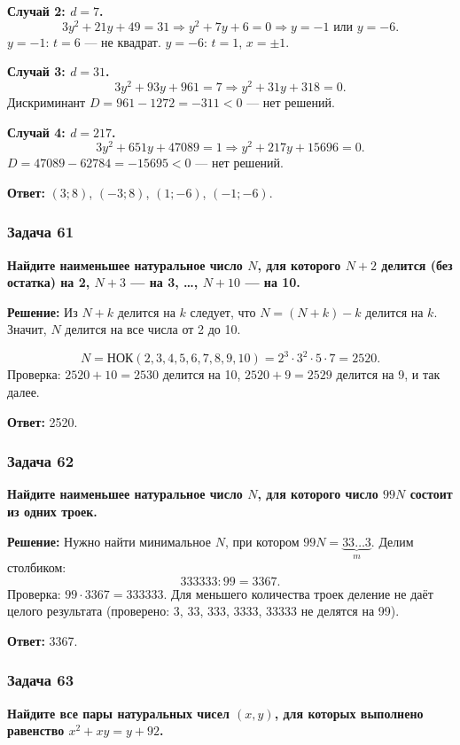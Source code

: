 \documentclass[12pt, a4paper]{article}
\begin{document}
\textbf{Случай 2: $d = 7$.}
\[
3y^2 + 21y + 49 = 31 \Rightarrow y^2 + 7y + 6 = 0 \Rightarrow y = -1 \text{ или } y = -6.
\]
$y = -1$: $t = 6$ — не квадрат. $y = -6$: $t = 1$, $x = \pm 1$.

\textbf{Случай 3: $d = 31$.}
\[
3y^2 + 93y + 961 = 7 \Rightarrow y^2 + 31y + 318 = 0.
\]
Дискриминант $D = 961 - 1272 = -311 < 0$ — нет решений.

\textbf{Случай 4: $d = 217$.}
\[
3y^2 + 651y + 47089 = 1 \Rightarrow y^2 + 217y + 15696 = 0.
\]
$D = 47089 - 62784 = -15695 < 0$ — нет решений.

\textbf{Ответ:} $(3; 8)$, $(-3; 8)$, $(1; -6)$, $(-1; -6)$.

\subsubsection*{Задача 61}
\textbf{Найдите наименьшее натуральное число $N$, для которого $N + 2$ делится (без остатка) на 2, $N + 3$ — на 3, \ldots, $N + 10$ — на 10.}

\textbf{Решение:}
Из $N + k$ делится на $k$ следует, что $N = (N+k) - k$ делится на $k$. Значит, $N$ делится на все числа от 2 до 10.

\[
N = \text{НОК}(2, 3, 4, 5, 6, 7, 8, 9, 10) = 2^3 \cdot 3^2 \cdot 5 \cdot 7 = 2520.
\]
Проверка: $2520 + 10 = 2530$ делится на 10, $2520 + 9 = 2529$ делится на 9, и так далее.

\textbf{Ответ:} 2520.

\subsubsection*{Задача 62}
\textbf{Найдите наименьшее натуральное число $N$, для которого число $99N$ состоит из одних троек.}

\textbf{Решение:}
Нужно найти минимальное $N$, при котором $99N = \underbrace{33\ldots3}_{m}$. Делим столбиком:
\[
333333 : 99 = 3367.
\]
Проверка: $99 \cdot 3367 = 333333$. Для меньшего количества троек деление не даёт целого результата (проверено: 3, 33, 333, 3333, 33333 не делятся на 99).

\textbf{Ответ:} 3367.

\subsubsection*{Задача 63}
\textbf{Найдите все пары натуральных чисел $(x, y)$, для которых выполнено равенство $x^2 + xy = y + 92$.}
\end{document}
